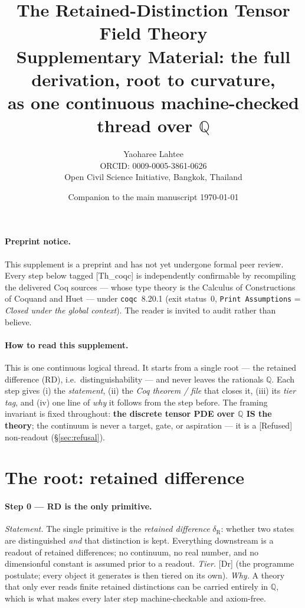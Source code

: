 \documentclass[10pt,twocolumn]{article}
\title{\bfseries The Retained-Distinction Tensor Field Theory\\
\large Supplementary Material: the full derivation, root to curvature,\\
as one continuous machine-checked thread over $\mathbb{Q}$}
\author{Yaoharee Lahtee\\[2pt]
\small ORCID: 0009-0005-3861-0626\\
\small Open Civil Science Initiative, Bangkok, Thailand}
\date{\small Companion to the main manuscript \;\textbullet\; \today}
\theoremstyle{definition}
\newcommand{\Thq}{\textsf{[Th\_coqc]}}   %
\newcommand{\Dr}{\textsf{[Dr]}}          %
\newcommand{\Refu}{\textsf{[Refused]}}    %
\newcommand{\code}[1]{\texttt{#1}}
\begin{document}
\maketitle
\thispagestyle{preprintfirst}

\paragraph*{Preprint notice.} This supplement is a preprint and has not yet
undergone formal peer review. Every step below tagged \Thq{} is independently
confirmable by recompiling the delivered Coq sources \cite{coq} --- whose
type theory is the Calculus of Constructions of Coquand and
Huet \cite{coquandhuet1988} --- under \code{coqc}~8.20.1
(exit status~0, \code{Print Assumptions} = \emph{Closed under the global
context}). The reader is invited to audit rather than believe.

\paragraph*{How to read this supplement.} This is one continuous logical
thread. It starts from a single root --- the retained difference (RD), i.e.\
distinguishability --- and never leaves the rationals $\mathbb{Q}$. Each step
gives (i) the \emph{statement}, (ii) the \emph{Coq theorem / file} that closes
it, (iii) its \emph{tier tag}, and (iv) one line of \emph{why} it follows from
the step before. The framing invariant is fixed throughout: \textbf{the
discrete tensor PDE over $\mathbb{Q}$ IS the theory}; the continuum is never a
target, gate, or aspiration --- it is a \Refu{} non-readout (\S\ref{sec:refusal}).

\section{The root: retained difference}\label{sec:root}
\paragraph{Step 0 --- RD is the only primitive.}
\emph{Statement.} The single primitive is the \emph{retained difference}
$\delta_{\mathrm R}$: whether two states are distinguished \emph{and} that
distinction is kept. Everything downstream is a readout of retained
differences; no continuum, no real number, and no dimensionful constant is
assumed prior to a readout.
\emph{Tier.} \Dr{} (the programme postulate; every object it generates is then
tiered on its own). \emph{Why.} A theory that only ever reads finite retained
distinctions can be carried entirely in $\mathbb{Q}$, which is what makes every
later step machine-checkable and axiom-free.
\end{document}
